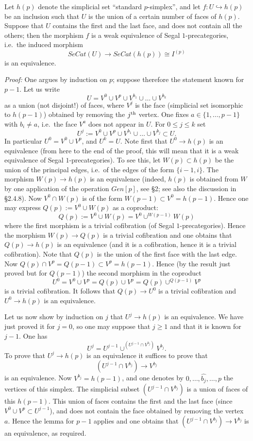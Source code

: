 \begin{lemma}
\label{faces}
Let $h(p)$ denote the simplicial set ``standard $p$-simplex'', and let
$f:U\hookrightarrow h(p)$ be an inclusion such that $U$ is the union of a
certain
number of faces of $h(p)$. Suppose that $U$ contains the first and the
last face, and does not contain all the others; then the morphism
$f$ is a weak equivalence of Segal $1$-precategories, i.e.\ the
induced morphism
$$
SeCat(U)\rightarrow SeCat(h(p))\cong I^{(p)}
$$
is an equivalence.
\end{lemma}
{\em Proof:}
One argues by induction on $p$; suppose therefore
the statement known for $p-1$.
Let us write
$$
U= V^0\cup V^p \cup V^{b_1}\cup \ldots \cup V^{b_k}
$$
as a union (not disjoint!) of faces, where $V^j$ is the face (simplicial
set isomorphic to $h(p-1)$) obtained by removing the $j^{\rm th}$
vertex. One fixes
$a\in \{ 1,\ldots , p-1\}$ with $b_i\neq a$, i.e.\ the face $V^a$
does not appear
in $U$. For $0\leq j\leq k$ set
$$
U^j:= V^0\cup V^p \cup V^{b_1}\cup \ldots \cup V^{b_j}\subset U.
$$
In particular $U^0= V^0\cup V^p$, and $U^k=U$. Note first that
$U^0\rightarrow h(p)$ is an equivalence (from here to the end of the proof,
this will mean that it is a weak equivalence of Segal $1$-precategories).
To see this, let $W(p)\subset h(p)$ be the union of the principal
edges,
i.e.\ of the edges of the form $\{ i-1, i\}$. The morphism
$W(p)\rightarrow h(p)$ is an equivalence (indeed, $h(p)$ is obtained
from $W$ by one application of the operation $Gen[p]$, see \S2;
see also the discussion in \cite{limits} \S2.4.8).
Now $V^0\cap W(p)$ is of the form $W(p-1)\subset V^0=h(p-1)$.
Hence one may express $Q(p):=V^0\cup W(p)$ as a coproduct:
$$
Q(p):=V^0\cup W(p) = V^0 \cup ^{W(p-1)}W(p)
$$
where the first morphism is a trivial cofibration (of Segal
$1$-precategories). Hence the morphism $W(p)\rightarrow Q(p)$ is a trivial
cofibration and one obtains that $Q(p)\rightarrow h(p)$ is an
equivalence (and it is a cofibration, hence it is a trivial cofibration).
Note that $Q(p)$ is the union of the first face with the last edge.
Now $Q(p) \cap V^p = Q(p-1)\subset V^p=h(p-1)$. Hence (by the result
just proved but for $Q(p-1)$) the second morphism in the
coproduct
$$
U^0= V^0\cup V^p = Q(p)\cup V^p = Q(p) \cup ^{Q(p-1)}V^p
$$
is a trivial cofibration. It follows that $Q(p)\rightarrow U^0$ is a
trivial cofibration and $U^0\rightarrow h(p)$ is an
equivalence.

Let us now show by induction on $j$ that $U^j\rightarrow h(p)$ is
an equivalence. We have just proved it for $j=0$, so one may suppose
that $j\geq 1$ and that it is known for $j-1$. One has
$$
U^j = U^{j-1} \cup ^{(U^{j-1}\cap V^{b_j})}V^{b_j}.
$$
To prove that $U^j\rightarrow h(p)$ is an equivalence it suffices to prove
that
$$
(U^{j-1}\cap V^{b_j})\rightarrow V^{b_j}
$$
is an equivalence. Now $V^{b_j} = h(p-1)$, and one denotes by
$0,\ldots , \widehat{b_j}, \ldots , p$
the vertices of this simplex. The simplicial subset
$(U^{j-1}\cap V^{b_j})$ is a union of faces of this $h(p-1)$. This
union
of faces contains the first and the last face (since $V^0\cup V^p\subset
U^{j-1}$), and does not contain the face obtained by removing the vertex
$a$. Hence the lemma for $p-1$ applies and one obtains that
$(U^{j-1}\cap V^{b_j})\rightarrow V^{b_j}$ is an equivalence, as required.
\eop

